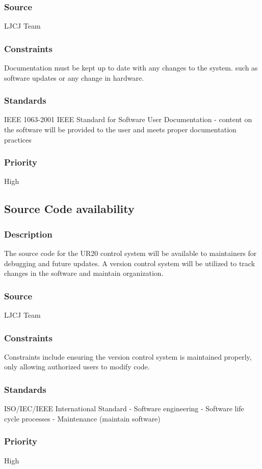 \subsubsection{Source}
LJCJ Team
\subsubsection{Constraints}
Documentation must be kept up to date with any changes to the system. such as software updates or any change in hardware. 
\subsubsection{Standards}
IEEE 1063-2001 IEEE Standard for Software User Documentation - content on the software will be provided to the user and meets proper documentation practices
\subsubsection{Priority}
High

\subsection{Source Code availability }
\subsubsection{Description}
The source code for the UR20 control system will be available to maintainers for debugging and future updates. A version control system will be utilized to track changes in the software and maintain organization. 
\subsubsection{Source}
LJCJ Team
\subsubsection{Constraints}
Constraints include ensuring the version control system is maintained properly, only allowing authorized users to modify code.
\subsubsection{Standards}
ISO/IEC/IEEE International Standard - Software engineering - Software life cycle processes - Maintenance (maintain software)
\subsubsection{Priority}
High

